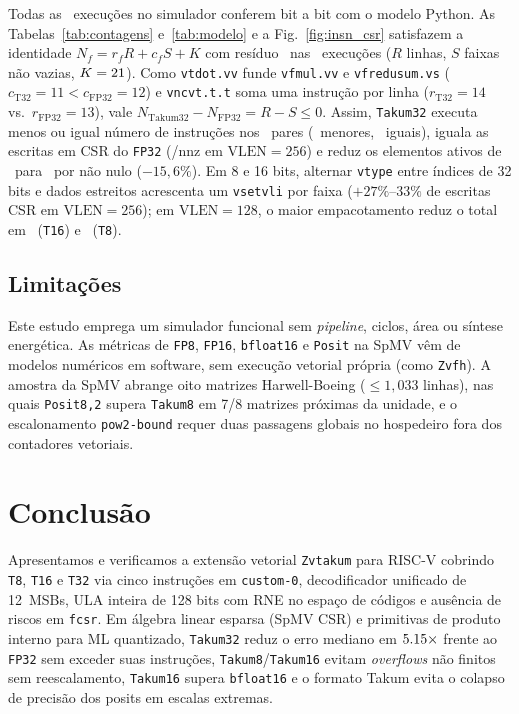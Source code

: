 \documentclass[conference]{IEEEtran}
\begin{document}
Todas as \NumBitExatas\ execu\c{c}\~oes no simulador conferem bit a bit com o modelo Python. As Tabelas~\ref{tab:contagens} e~\ref{tab:modelo} e a Fig.~\ref{fig:insn_csr} satisfazem a identidade $N_f = r_f R + c_f S + K$ com res\'iduo \ModResiduoMax\ nas \ModExec\ execu\c{c}\~oes ($R$ linhas, $S$ faixas n\~ao vazias, $K=21$). Como \texttt{vtdot.vv} funde \texttt{vfmul.vv} e \texttt{vfredusum.vs} ($c_{\text{T32}}=11 < c_{\text{FP32}}=12$) e \texttt{vncvt.t.t} soma uma instru\c{c}\~ao por linha ($r_{\text{T32}}=14$ vs.\ $r_{\text{FP32}}=13$), vale $N_{\text{Takum32}} - N_{\text{FP32}} = R - S \le 0$. Assim, \texttt{Takum32} executa menos ou igual n\'umero de instru\c{c}\~oes nos \InsnPares\ pares (\InsnMenorTrinta\ menores, \InsnIgualTrinta\ iguais), iguala as escritas em CSR do \texttt{FP32} (\CsrNnzTrintaDuzentos/nnz em $\mathrm{VLEN}=256$) e reduz os elementos ativos de \ElemNnzFP\ para \ElemNnzTakum\ por n\~ao nulo ($-15{,}6\%$). Em 8 e 16 bits, alternar \texttt{vtype} entre \'indices de 32 bits e dados estreitos acrescenta um \texttt{vsetvli} por faixa ($+27\%\text{--}33\%$ de escritas CSR em $\mathrm{VLEN}=256$); em $\mathrm{VLEN}=128$, o maior empacotamento reduz o total em \RelInsnDezCento\ (\texttt{T16}) e \RelInsnOitoCento\ (\texttt{T8}).

\subsection{Limita\c{c}\~oes}
Este estudo emprega um simulador funcional sem \emph{pipeline}, ciclos, \'area ou s\'intese energ\'etica. As m\'etricas de \texttt{FP8}, \texttt{FP16}, \texttt{bfloat16} e \texttt{Posit} na SpMV v\^em de modelos num\'ericos em software, sem execu\c{c}\~ao vetorial pr\'opria (como \texttt{Zvfh}). A amostra da SpMV abrange oito matrizes Harwell-Boeing ($\le 1{,}033$ linhas), nas quais \texttt{Posit8,2} supera \texttt{Takum8} em 7/8 matrizes pr\'oximas da unidade, e o escalonamento \texttt{pow2-bound} requer duas passagens globais no hospedeiro fora dos contadores vetoriais.

\section{Conclus\~ao}
Apresentamos e verificamos a extens\~ao vetorial \texttt{Zvtakum} para RISC-V cobrindo \texttt{T8}, \texttt{T16} e \texttt{T32} via cinco instru\c{c}\~oes em \texttt{custom-0}, decodificador unificado de 12~MSBs, ULA inteira de 128 bits com RNE no espa\c{c}o de c\'odigos e aus\^encia de riscos em \texttt{fcsr}. Em \'algebra linear esparsa (SpMV CSR) e primitivas de produto interno para ML quantizado, \texttt{Takum32} reduz o erro mediano em $5.15\times$ frente ao \texttt{FP32} sem exceder suas instru\c{c}\~oes, \texttt{Takum8}/\texttt{Takum16} evitam \emph{overflows} n\~ao finitos sem reescalamento, \texttt{Takum16} supera \texttt{bfloat16} e o formato Takum evita o colapso de precis\~ao dos posits em escalas extremas.
\end{document}
